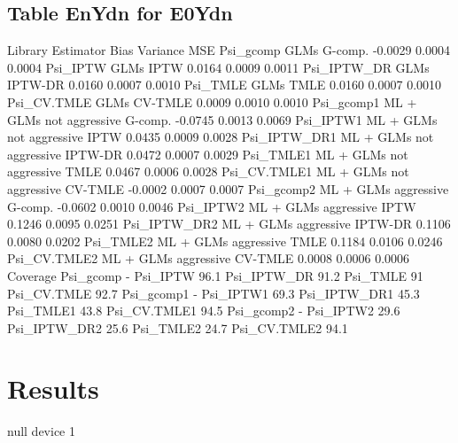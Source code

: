 \documentclass[11pt]{article}
\begin{document}
\subsection{Table EnYdn for E0Ydn}
\begin{Schunk}
\begin{Soutput}
                              Library Estimator    Bias Variance    MSE
Psi_gcomp                        GLMs   G-comp. -0.0029   0.0004 0.0004
Psi_IPTW                         GLMs      IPTW  0.0164   0.0009 0.0011
Psi_IPTW_DR                      GLMs   IPTW-DR  0.0160   0.0007 0.0010
Psi_TMLE                         GLMs      TMLE  0.0160   0.0007 0.0010
Psi_CV.TMLE                      GLMs   CV-TMLE  0.0009   0.0010 0.0010
Psi_gcomp1   ML + GLMs not aggressive   G-comp. -0.0745   0.0013 0.0069
Psi_IPTW1    ML + GLMs not aggressive      IPTW  0.0435   0.0009 0.0028
Psi_IPTW_DR1 ML + GLMs not aggressive   IPTW-DR  0.0472   0.0007 0.0029
Psi_TMLE1    ML + GLMs not aggressive      TMLE  0.0467   0.0006 0.0028
Psi_CV.TMLE1 ML + GLMs not aggressive   CV-TMLE -0.0002   0.0007 0.0007
Psi_gcomp2       ML + GLMs aggressive   G-comp. -0.0602   0.0010 0.0046
Psi_IPTW2        ML + GLMs aggressive      IPTW  0.1246   0.0095 0.0251
Psi_IPTW_DR2     ML + GLMs aggressive   IPTW-DR  0.1106   0.0080 0.0202
Psi_TMLE2        ML + GLMs aggressive      TMLE  0.1184   0.0106 0.0246
Psi_CV.TMLE2     ML + GLMs aggressive   CV-TMLE  0.0008   0.0006 0.0006
             Coverage
Psi_gcomp           -
Psi_IPTW        96.1%
Psi_IPTW_DR     91.2%
Psi_TMLE          91%
Psi_CV.TMLE     92.7%
Psi_gcomp1          -
Psi_IPTW1       69.3%
Psi_IPTW_DR1    45.3%
Psi_TMLE1       43.8%
Psi_CV.TMLE1    94.5%
Psi_gcomp2          -
Psi_IPTW2       29.6%
Psi_IPTW_DR2    25.6%
Psi_TMLE2       24.7%
Psi_CV.TMLE2    94.1%
\end{Soutput}
\end{Schunk}




\section{Results}
\begin{Schunk}
\begin{Soutput}
null device 
          1 
\end{Soutput}
\end{Schunk}
\end{document}
